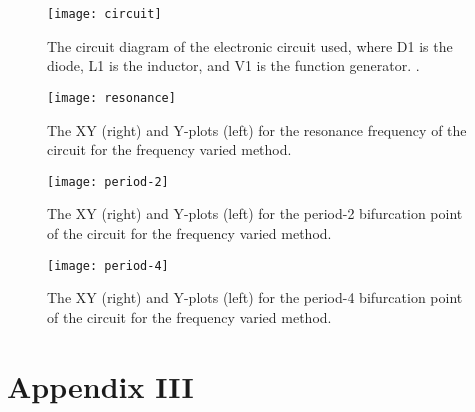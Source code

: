 \documentclass[12pt]{report}
\theoremstyle{definition}
\begin{document}
\begin{figure}[!htb]
\centering
\texttt{[image: circuit]}
\caption{The circuit diagram of the electronic circuit used, where D1 is the diode, L1 is the inductor, and V1 is the function generator. \cite{MR}. \label{circuit}}
\end{figure}

\begin{figure}[!htb]
\centering
\texttt{[image: resonance]}
\caption{The XY (right) and Y-plots (left) for the resonance frequency of the circuit for the frequency varied method. \label{resonance}}
\end{figure}

\begin{figure}[!htb]
\centering
\texttt{[image: period-2]}
\caption{The XY (right) and Y-plots (left) for the period-2 bifurcation point of the circuit for the frequency varied method. \label{period-2}}
\end{figure}

\begin{figure}[!htb]
\centering
\texttt{[image: period-4]}
\caption{The XY (right) and Y-plots (left) for the period-4 bifurcation point of the circuit for the frequency varied method. \label{period-4}}
\end{figure}

\clearpage


\section*{Appendix III}
\end{document}
